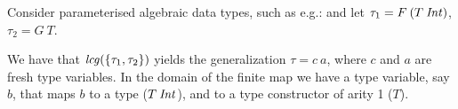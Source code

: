 \begin{Example}
  \label{ex-polykindedness}
  
  Consider parameterised algebraic data types, such as e.g.:
  and let $\tau_1 = F\: (T\: {\it Int\/})$, $\tau_2 = G\: T$. 

  We have that ${\it lcg\/}(\{\tau_1,\tau_2\})$ yields the generalization
  $\tau = c\: a$, where $c$ and $a$ are fresh type variables.  In the
  domain of the finite map we have a type variable, say $b$, that maps
  $b$ to a type ($T\:{\it Int\/}$), and to a type constructor of arity 1 ($T$). 

\end{Example}

\begin{figure}[ht]
\end{figure}
